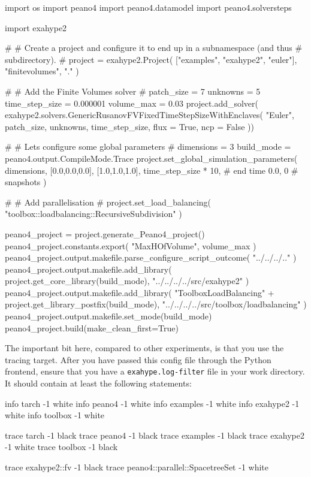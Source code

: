 \begin{code}
import os
import peano4
import peano4.datamodel
import peano4.solversteps

import exahype2

#
# Create a project and configure it to end up in a subnamespace (and thus
# subdirectory). 
#
project = exahype2.Project( ["examples", "exahype2", "euler"], "finitevolumes", "." )

#
# Add the Finite Volumes solver
#
patch_size     = 7
unknowns       = 5
time_step_size = 0.000001
volume_max     = 0.03
project.add_solver(  exahype2.solvers.GenericRusanovFVFixedTimeStepSizeWithEnclaves(
  "Euler", 
  patch_size, 
  unknowns, time_step_size,
  flux = True,
  ncp  = False
))


#
# Lets configure some global parameters
#
dimensions = 3
build_mode = peano4.output.CompileMode.Trace
project.set_global_simulation_parameters(
  dimensions, [0.0,0.0,0.0], [1.0,1.0,1.0],
  time_step_size * 10,           # end time
  0.0, 0                         # snapshots
)


#
# Add parallelisation
#
project.set_load_balancing( "toolbox::loadbalancing::RecursiveSubdivision" )

peano4_project = project.generate_Peano4_project()
peano4_project.constants.export( "MaxHOfVolume", volume_max )
peano4_project.output.makefile.parse_configure_script_outcome( "../../../.." )
peano4_project.output.makefile.add_library( project.get_core_library(build_mode), 
 "../../../../src/exahype2" )
peano4_project.output.makefile.add_library( "ToolboxLoadBalancing" + 
 project.get_library_postfix(build_mode),
 "../../../../src/toolbox/loadbalancing" )
peano4_project.output.makefile.set_mode(build_mode)
peano4_project.build(make_clean_first=True)
\end{code}

\noindent
The important bit here, compared to other experiments, is that you use the
tracing target.
After you have passed this config file through the Python frontend, ensure that
you have a \texttt{exahype.log-filter} file in your work directory.
It should contain at least the following statements:

\begin{code}
info tarch    -1 white
info peano4   -1 white
info examples -1 white
info exahype2 -1 white
info toolbox  -1 white

trace tarch    -1 black
trace peano4   -1 black
trace examples -1 black
trace exahype2 -1 white
trace toolbox  -1 black

trace exahype2::fv -1 black
trace peano4::parallel::SpacetreeSet -1 white
\end{code}



